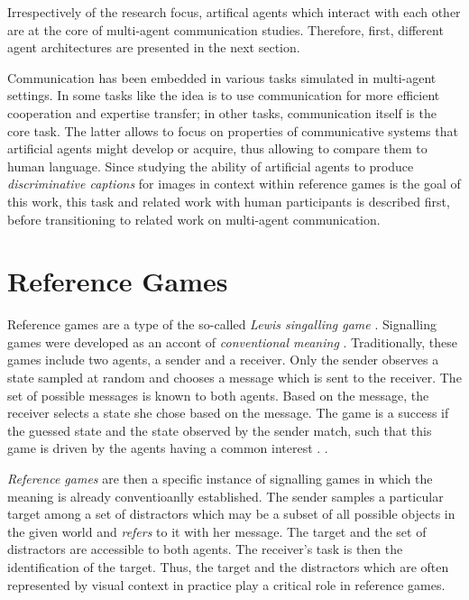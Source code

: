 Irrespectively of the research focus, artifical agents which interact with each other are at the core of multi-agent communication studies. Therefore, first, different agent architectures are presented in the next section.


Communication has been embedded in various tasks simulated in multi-agent settings. In some tasks like  the idea is to use communication for more efficient cooperation and expertise transfer; in other tasks, communication itself is the core task. The latter allows to focus on properties of communicative systems that artificial agents might develop or acquire, thus allowing to compare them to human language. Since studying the ability of artificial agents to produce \textit{discriminative captions} for images in context within reference games is the goal of this work, this task and related work with human participants is described first, before transitioning to related work on multi-agent communication.


\section{Reference Games}
\label{reference_games}

Reference games are a type of the so-called \textit{Lewis singalling game} \parencite{lewis1969convention, skyrms2010signals}.
Signalling games were developed as an accont of \textit{conventional meaning} . Traditionally, these games include two agents, a sender and a receiver. Only the sender observes a state sampled at random and chooses a message which is sent to the receiver. The set of possible messages is known to both agents. Based on the message, the receiver selects a state she chose based on the message. The game is a success if the guessed state and the state observed by the sender match, such that this game is driven by the agents having a common interest \parencite{lewis1969convention, franke2016evolution}. . 

\textit{Reference games} are then a specific instance of signalling games in which the meaning is already conventioanlly established. The sender samples a particular target among a set of distractors which may be a subset of all possible objects in the given world and \textit{refers} to it with her message. The target and the set of distractors are accessible to both agents. The receiver's task is then the identification of the target. Thus, the target and the distractors which are often represented by visual context in practice play a critical role in reference games.

